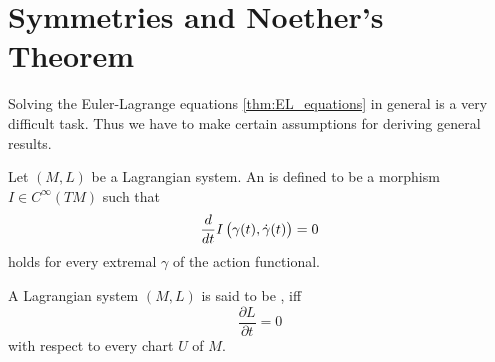 \section*{Symmetries and Noether's Theorem}
Solving the Euler-Lagrange equations \ref{thm:EL_equations} in general is a very difficult task. Thus we have to make certain assumptions for deriving general results.

\begin{definition}
	Let $(M,L)$ be a Lagrangian system. An  is defined to be a morphism $I \in C^\infty(TM)$ such that
	\begin{equation*}
		\frac{d}{dt}I\del[1]{\gamma(t),\dot{\gamma}(t)} = 0
	\end{equation*}
	\noindent holds for every extremal $\gamma$ of the action functional.
\end{definition}

\begin{definition}[Energy]
	
\end{definition}

\begin{definition}
	A Lagrangian system $(M,L)$ is said to be , iff
	\begin{equation*}
		\frac{\partial L}{\partial t} = 0
	\end{equation*}
	\noindent with respect to every chart $U$ of $M$.
\end{definition}
